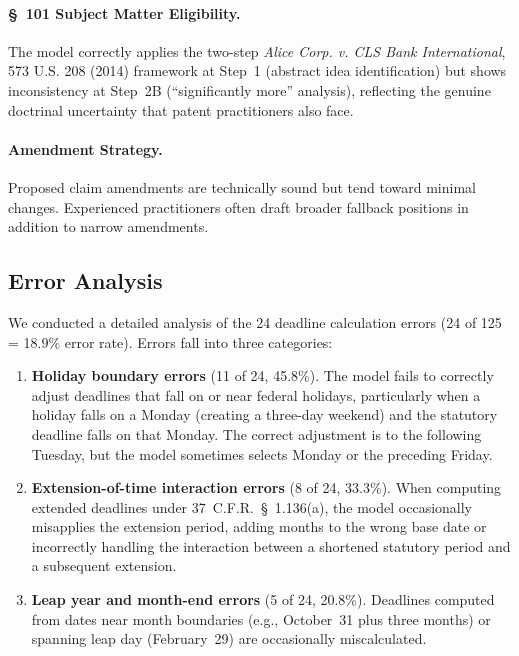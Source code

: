 \documentclass[11pt]{article}
\begin{document}
\paragraph{\S~101 Subject Matter Eligibility.} The model correctly applies the two-step \textit{Alice Corp. v. CLS Bank International}, 573 U.S. 208 (2014) framework at Step~1 (abstract idea identification) but shows inconsistency at Step~2B (``significantly more'' analysis), reflecting the genuine doctrinal uncertainty that patent practitioners also face.

\paragraph{Amendment Strategy.} Proposed claim amendments are technically sound but tend toward minimal changes. Experienced practitioners often draft broader fallback positions in addition to narrow amendments.

\subsection{Error Analysis}
\label{sec:error}

We conducted a detailed analysis of the 24 deadline calculation errors (24 of 125 = 18.9\% error rate). Errors fall into three categories:

\begin{enumerate}[leftmargin=*]
    \item \textbf{Holiday boundary errors} (11 of 24, 45.8\%). The model fails to correctly adjust deadlines that fall on or near federal holidays, particularly when a holiday falls on a Monday (creating a three-day weekend) and the statutory deadline falls on that Monday. The correct adjustment is to the following Tuesday, but the model sometimes selects Monday or the preceding Friday.

    \item \textbf{Extension-of-time interaction errors} (8 of 24, 33.3\%). When computing extended deadlines under 37~C.F.R.~\S~1.136(a), the model occasionally misapplies the extension period, adding months to the wrong base date or incorrectly handling the interaction between a shortened statutory period and a subsequent extension.

    \item \textbf{Leap year and month-end errors} (5 of 24, 20.8\%). Deadlines computed from dates near month boundaries (e.g., October~31 plus three months) or spanning leap day (February~29) are occasionally miscalculated.
\end{enumerate}
\end{document}
